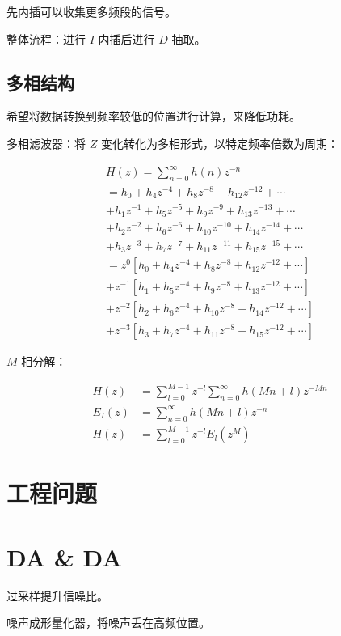 \documentclass[cn,11pt,chinese,black,simple]{elegantbook}
\begin{document}
先内插可以收集更多频段的信号。

整体流程：进行 \(I\) 内插后进行 \(D\) 抽取。

\subsection{多相结构}

希望将数据转换到频率较低的位置进行计算，来降低功耗。

多相滤波器：将 \(Z\) 变化转化为多相形式，以特定频率倍数为周期：

\[\begin{array}{l}
    H(z)=\sum_{n=0}^{\infty} h(n) z^{-n} \\
    =h_{0}+h_{4} z^{-4}+h_{8} z^{-8}+h_{12} z^{-12}+\cdots \\
    +h_{1} z^{-1}+h_{5} z^{-5}+h_{9} z^{-9}+h_{13} z^{-13}+\cdots \\
    +h_{2} z^{-2}+h_{6} z^{-6}+h_{10} z^{-10}+h_{14} z^{-14}+\cdots \\
    +h_{3} z^{-3}+h_{7} z^{-7}+h_{11} z^{-11}+h_{15} z^{-15}+\cdots \\
    =z^{0}\left[h_{0}+h_{4} z^{-4}+h_{8} z^{-8}+h_{12} z^{-12}+\cdots\right] \\
    +z^{-1}\left[h_{1}+h_{5} z^{-4}+h_{9} z^{-8}+h_{13} z^{-12}+\cdots\right] \\
    +z^{-2}\left[h_{2}+h_{6} z^{-4}+h_{10} z^{-8}+h_{14} z^{-12}+\cdots\right] \\
    +z^{-3}\left[h_{3}+h_{7} z^{-4}+h_{11} z^{-8}+h_{15} z^{-12}+\cdots\right]
\end{array}\]

\(M\) 相分解：

\[\begin{aligned}
    H(z) &=\sum_{l=0}^{M-1} z^{-l} \sum_{n=0}^{\infty} h(M n+l) z^{-M n} \\
    E_{I}(z) &=\sum_{n=0}^{\infty} h(M n+l) z^{-n} \\
    H(z) &=\sum_{l=0}^{M-1} z^{-l} E_{l}\left(z^{M}\right)
\end{aligned}\]


\section{工程问题}

\section{DA \& DA} 

过采样提升信噪比。

噪声成形量化器，将噪声丢在高频位置。


\let\chapname\undefined
\ifx\mainclass\undefined
\end{document}
